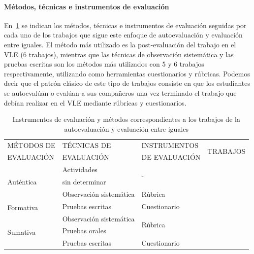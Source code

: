 \paragraph*{Métodos, técnicas e instrumentos de evaluación}
En~\ref{tab:MetodosAuto} se indican los métodos, técnicas e instrumentos de evaluación seguidas por cada uno de los trabajos que sigue este enfoque de autoevaluación y evaluación entre iguales. El método más utilizado es la post-evaluación del trabajo en el VLE (6 trabajos), mientras que las técnicas de observación sistemática y las pruebas escritas son los métodos más utilizados con 5 y 6 trabajos respectivamente, utilizando como herramientas cuestionarios y rúbricas. Podemos decir que el patrón clásico de este tipo de trabajos consiste en que los estudiantes se autoevalúan o evalúan a sus compañeros una vez terminado el trabajo que debían realizar en el VLE mediante rúbricas y cuestionarios. 

\begin{table}
  \begin{center}
  \begin{tabular}{| m{3cm} | m{3cm} | m{3.5cm} | m{2cm} |} %
    \hline
    MÉTODOS DE  & TÉCNICAS DE  & INSTRUMENTOS  & \multirow{2}{*}{TRABAJOS} \\
    EVALUACIÓN & EVALUACIÓN & DE EVALUACIÓN &  \\
    \hline
    \hline
    \multirow{4}{*}{Auténtica} & Actividades   & \multirow{2}{*}{-} & \multirow{2}{*}{\cite{renau2010teaching}} \\
     & sin determinar  &  &  \\
    \cline{2-4}
     & \multirow{2}{3cm}{Observación sistemática} & \multirow{2}{*}{Rúbrica} & \multirow{2}{*}{\cite{oliver2013graduate}} \\
     &  &  &  \\
    \hline
    \multirow{2}{*}{Formativa} & Pruebas escritas & Cuestionario & \cite{achcaoucaou2014competence}  \\
    \cline{2-4}
     & \multirow{2}{3cm}{Observación sistemática} & \multirow{3}{*}{Rúbrica} & \cite{arno2011promoting,piedra2010measuring} \\
    \cline{1-1} \cline{4-4}
    \multirow{3}{*}{Sumativa} &  &  & \cite{carreras2013promotion,lasa2013problem}  \\
    \cline{2-2} \cline{4-4}
     & Pruebas orales &  & \cite{masip2013self} \\
    \cline{2-4}
     & Pruebas escritas & Cuestionario & \cite{chang2009international,ficapal2015learning,martinez2014teamwork,ruizacarate2013soft,sevilla2012assessment} \\
    \hline
  \end{tabular}
\end{center}
\caption{Instrumentos de evaluación y métodos correspondientes a los trabajos de la autoevaluación y evaluación entre iguales}
\label{tab:MetodosAuto}
\end{table}

